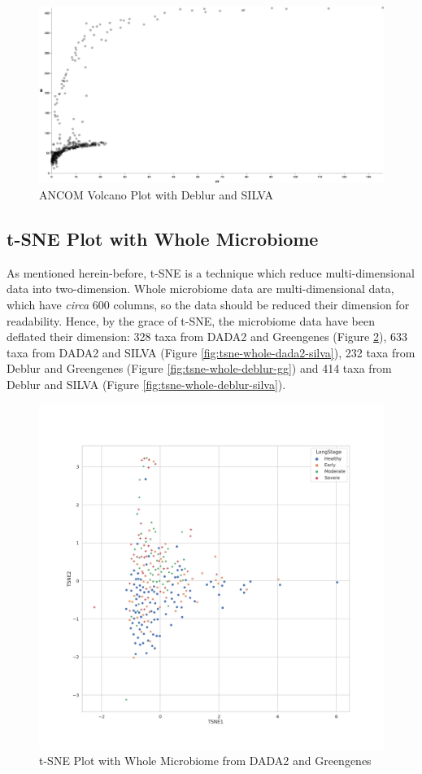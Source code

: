\documentclass[a4paper]{article}
\begin{document}
            \begin{figure}[p]
                \centering
                \includegraphics[width=0.8 \linewidth]{figures/ANCOM/Deblur.silva.png}
                \caption{ANCOM Volcano Plot with Deblur and SILVA}
                \label{fig:volcano-deblur-silva}
            \end{figure}

        \subsection{t-SNE Plot with Whole Microbiome}
            As mentioned herein-before, t-SNE is a technique which reduce multi-dimensional data into two-dimension. Whole microbiome data are multi-dimensional data, which have \textit{circa} 600 columns, so the data should be reduced their dimension for readability. Hence, by the grace of t-SNE, the microbiome data have been deflated their dimension: 328 taxa from DADA2 and Greengenes (Figure \ref{fig:tsne-whole-dada2-gg}), 633 taxa from DADA2 and SILVA (Figure \ref{fig:tsne-whole-dada2-silva}), 232 taxa from Deblur and Greengenes (Figure \ref{fig:tsne-whole-deblur-gg}) and 414 taxa from Deblur and SILVA (Figure \ref{fig:tsne-whole-deblur-silva}).

            \begin{figure}[p]
                \centering
                \includegraphics[width=0.6 \linewidth]{figures/tSNE/Whole/whole.DADA2.gg.png}
                \caption{t-SNE Plot with Whole Microbiome from DADA2 and Greengenes}
                \label{fig:tsne-whole-dada2-gg}
            \end{figure}
\end{document}
